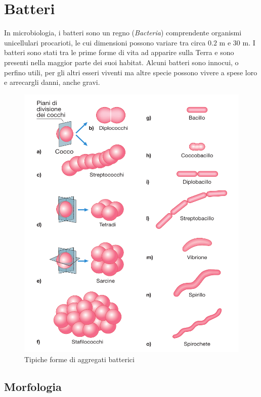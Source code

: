 \documentclass[../main.tex]{subfiles}
\begin{document}
\section{Batteri}

In \Gls{microbiologia}, i batteri sono un regno (\textit{Bacteria}) comprendente organismi unicellulari procarioti, le cui dimensioni possono variare tra circa $0.2$ \micro m e $30$ \micro m.\cite{goker_2024} I batteri sono stati tra le prime forme di vita ad apparire sulla Terra e sono presenti nella maggior parte dei suoi habitat. Alcuni batteri sono innocui, o perfino utili\cite{mccutcheon_2021}, per gli altri esseri viventi ma altre specie possono vivere a spese loro e arrecargli danni, anche gravi.\cite{johnson_2018}
\medskip

\begin{figure}[h]
	\centering
	\includegraphics[keepaspectratio, width=0.95\linewidth]{images/batteri_morfologia.png}
	\caption[Tipiche forme di aggregati batterici]{
		Tipiche forme di aggregati batterici \cite{deho_galli_2020}}
	\label{fig:bacteria_morphology}
\end{figure}

\subsection{Morfologia}
\end{document}
